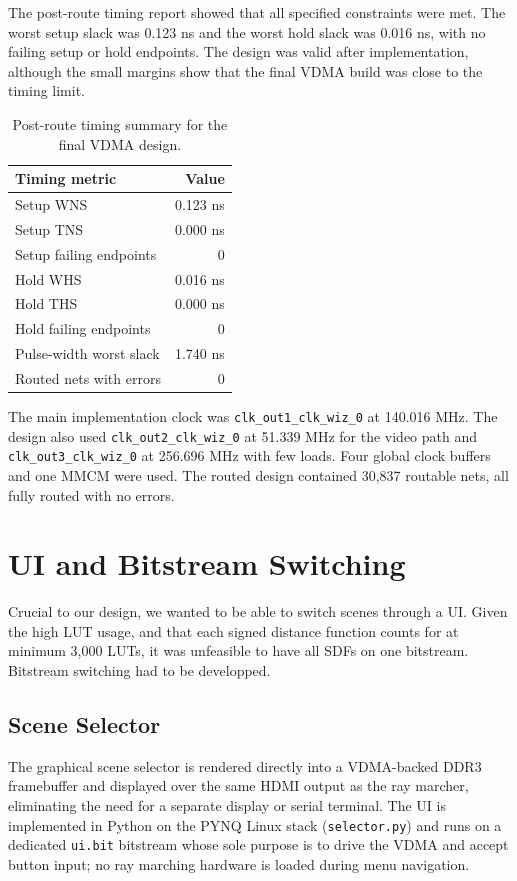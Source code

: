 The post-route timing report showed that all specified constraints were met. The worst setup slack was 0.123 ns and the worst hold slack was 0.016 ns, with no failing setup or hold endpoints. The design was valid after implementation, although the small margins show that the final VDMA build was close to the timing limit.

\begin{table}[htbp]
\centering
\caption{Post-route timing summary for the final VDMA design.}
\label{tab:timing_summary}
\begin{tabular}{|l|r|}
\hline
Timing metric & Value \\
\hline
Setup WNS & 0.123 ns \\
Setup TNS & 0.000 ns \\
Setup failing endpoints & 0 \\
Hold WHS & 0.016 ns \\
Hold THS & 0.000 ns \\
Hold failing endpoints & 0 \\
Pulse-width worst slack & 1.740 ns \\
Routed nets with errors & 0 \\
\hline
\end{tabular}
\end{table}

The main implementation clock was \verb|clk_out1_clk_wiz_0| at 140.016 MHz. The design also used \verb|clk_out2_clk_wiz_0| at 51.339 MHz for the video path and \verb|clk_out3_clk_wiz_0| at 256.696 MHz with few loads. Four global clock buffers and one MMCM were used. The routed design contained 30,837 routable nets, all fully routed with no errors.

\section{UI and Bitstream Switching}

Crucial to our design, we wanted to be able to switch scenes through a UI. Given the high LUT usage, and that each signed distance function counts for at minimum 3,000 LUTs, it was unfeasible to have all SDFs on one bitstream. Bitstream switching had to be developped.

\subsection{Scene Selector}

The graphical scene selector is rendered directly into a VDMA-backed DDR3
framebuffer and displayed over the same HDMI output as the ray marcher,
eliminating the need for a separate display or serial terminal. The UI is
implemented in Python on the PYNQ Linux stack (\texttt{selector.py}) and
runs on a dedicated \texttt{ui.bit} bitstream whose sole purpose is to drive
the VDMA and accept button input; no ray marching hardware is loaded
during menu navigation.

